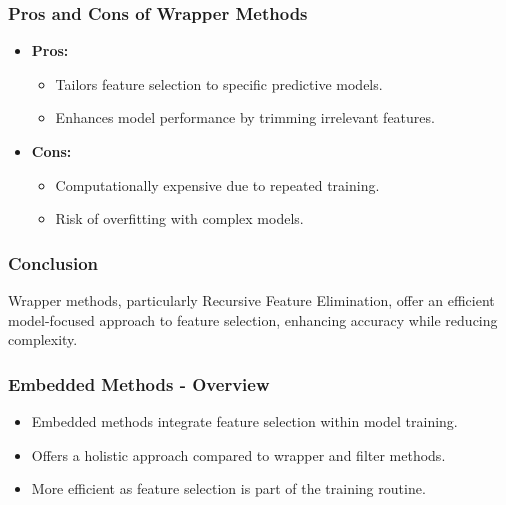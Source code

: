 \documentclass[aspectratio=169]{beamer}
\begin{document}
\begin{frame}[fragile]
    \frametitle{Pros and Cons of Wrapper Methods}
    \begin{itemize}
        \item \textbf{Pros:}
        \begin{itemize}
            \item Tailors feature selection to specific predictive models.
            \item Enhances model performance by trimming irrelevant features.
        \end{itemize}
        \item \textbf{Cons:}
        \begin{itemize}
            \item Computationally expensive due to repeated training.
            \item Risk of overfitting with complex models.
        \end{itemize}
    \end{itemize}
\end{frame}

\begin{frame}[fragile]
    \frametitle{Conclusion}
    Wrapper methods, particularly Recursive Feature Elimination, offer an efficient model-focused approach to feature selection, enhancing accuracy while reducing complexity.
\end{frame}

\begin{frame}[fragile]
    \frametitle{Embedded Methods - Overview}
    \begin{itemize}
        \item Embedded methods integrate feature selection within model training.
        \item Offers a holistic approach compared to wrapper and filter methods.
        \item More efficient as feature selection is part of the training routine.
    \end{itemize}
\end{frame}
\end{document}
